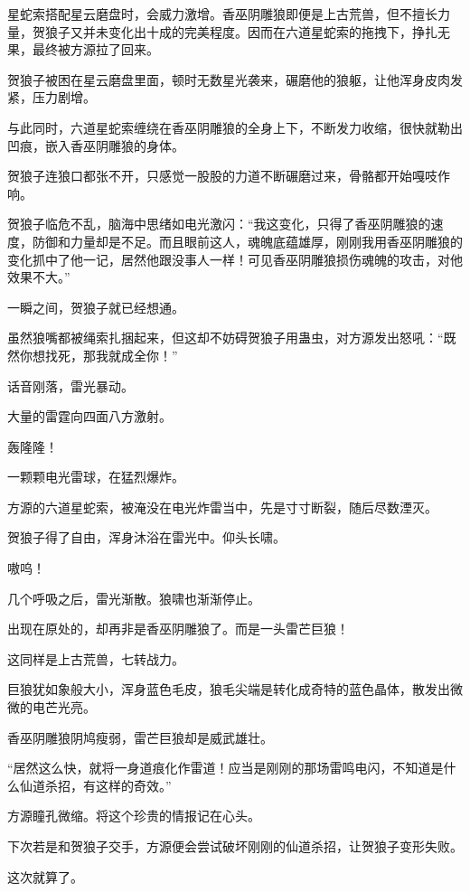 
\begin{this_body}

星蛇索搭配星云磨盘时，会威力激增。香巫阴雕狼即便是上古荒兽，但不擅长力量，贺狼子又并未变化出十成的完美程度。因而在六道星蛇索的拖拽下，挣扎无果，最终被方源拉了回来。

贺狼子被困在星云磨盘里面，顿时无数星光袭来，碾磨他的狼躯，让他浑身皮肉发紧，压力剧增。

与此同时，六道星蛇索缠绕在香巫阴雕狼的全身上下，不断发力收缩，很快就勒出凹痕，嵌入香巫阴雕狼的身体。

贺狼子连狼口都张不开，只感觉一股股的力道不断碾磨过来，骨骼都开始嘎吱作响。

贺狼子临危不乱，脑海中思绪如电光激闪：“我这变化，只得了香巫阴雕狼的速度，防御和力量却是不足。而且眼前这人，魂魄底蕴雄厚，刚刚我用香巫阴雕狼的变化抓中了他一记，居然他跟没事人一样！可见香巫阴雕狼损伤魂魄的攻击，对他效果不大。”

一瞬之间，贺狼子就已经想通。

虽然狼嘴都被绳索扎捆起来，但这却不妨碍贺狼子用蛊虫，对方源发出怒吼：“既然你想找死，那我就成全你！”

话音刚落，雷光暴动。

大量的雷霆向四面八方激射。

轰隆隆！

一颗颗电光雷球，在猛烈爆炸。

方源的六道星蛇索，被淹没在电光炸雷当中，先是寸寸断裂，随后尽数湮灭。

贺狼子得了自由，浑身沐浴在雷光中。仰头长啸。

嗷呜！

几个呼吸之后，雷光渐散。狼啸也渐渐停止。

出现在原处的，却再非是香巫阴雕狼了。而是一头雷芒巨狼！

这同样是上古荒兽，七转战力。

巨狼犹如象般大小，浑身蓝色毛皮，狼毛尖端是转化成奇特的蓝色晶体，散发出微微的电芒光亮。

香巫阴雕狼阴鸠瘦弱，雷芒巨狼却是威武雄壮。

“居然这么快，就将一身道痕化作雷道！应当是刚刚的那场雷鸣电闪，不知道是什么仙道杀招，有这样的奇效。”

方源瞳孔微缩。将这个珍贵的情报记在心头。

下次若是和贺狼子交手，方源便会尝试破坏刚刚的仙道杀招，让贺狼子变形失败。

这次就算了。


\end{this_body}
